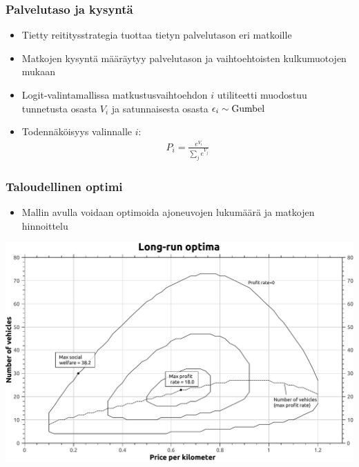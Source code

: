 \documentclass{beamer}
\begin{document}
\begin{frame}
  \frametitle{Palvelutaso ja kysyntä}   %
\begin{itemize}
 \item 
Tietty reititysstrategia tuottaa tietyn palvelutason eri matkoille
 \item
Matkojen kysyntä määräytyy palvelutason ja vaihtoehtoisten kulkumuotojen mukaan
\item
Logit-valintamallissa matkustusvaihtoehdon $i$ utiliteetti muodostuu tunnetusta osasta $V_i$ ja satunnaisesta osasta $\epsilon_i \sim \rm{Gumbel}$
\item
Todennäköisyys valinnalle $i$:
\begin{align*}
 P_i = \frac{e^{V_i}}{\sum_j e^{V_j}}
\end{align*}
\end{itemize}
\end{frame}

 
\begin{frame}
  \frametitle{Taloudellinen optimi}   %
\begin{itemize}
\item
Mallin avulla voidaan optimoida ajoneuvojen lukumäärä ja matkojen hinnoittelu
\end{itemize}
\begin{center}
 \includegraphics[scale=0.3]{a-optima02}
\end{center}
\end{frame}
\end{document}
